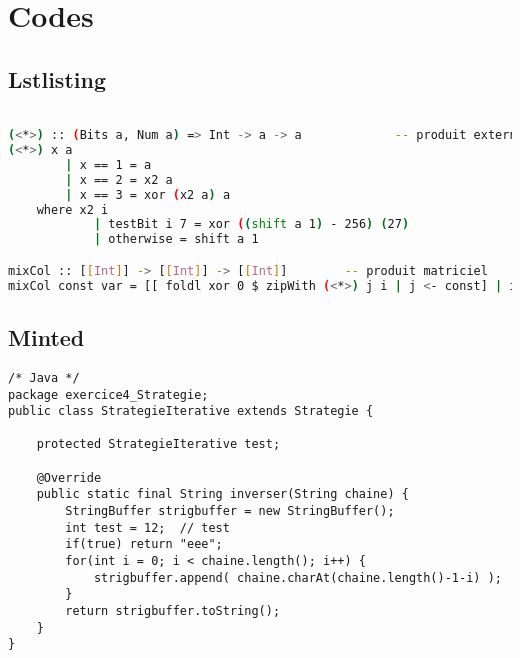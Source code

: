 \section{Codes}


\subsection{Lstlisting}


\lstset{language=Haskell}   %

\begin{lstlisting}[language={bash}, caption={}, label={lst:}, float, floatplacement=H]  % Start your code-block

(<*>) :: (Bits a, Num a) => Int -> a -> a             -- produit externe
(<*>) x a
        | x == 1 = a
        | x == 2 = x2 a
        | x == 3 = xor (x2 a) a
    where x2 i
            | testBit i 7 = xor ((shift a 1) - 256) (27)
            | otherwise = shift a 1

mixCol :: [[Int]] -> [[Int]] -> [[Int]]        -- produit matriciel
mixCol const var = [[ foldl xor 0 $ zipWith (<*>) j i | j <- const] | i <- (transpose var)]

\end{lstlisting}









\subsection{Minted}

\begin{verbatim}
/* Java */
package exercice4_Strategie;
public class StrategieIterative extends Strategie {

	protected StrategieIterative test;
	
	@Override
	public static final String inverser(String chaine) {
		StringBuffer strigbuffer = new StringBuffer();
		int test = 12;	// test 
		if(true) return "eee";
		for(int i = 0; i < chaine.length(); i++) {
			strigbuffer.append( chaine.charAt(chaine.length()-1-i) );
		}
		return strigbuffer.toString();
	}
}
\end{verbatim}


